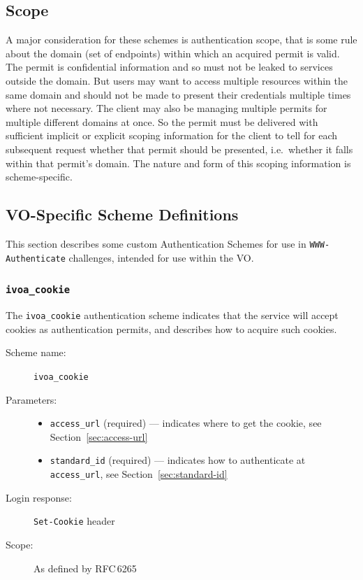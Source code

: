 \documentclass[11pt,a4paper]{ivoa}
\newcommand{\rfc}[1]{RFC\,#1}
\newcommand{\header}[1]{{\tt #1}}
\begin{document}
\subsection{Scope}\label{sec:scope}

A major consideration for these schemes is authentication scope,
that is some rule about the domain (set of endpoints) within which an
acquired permit is valid.
The permit is confidential information and so must not be leaked to services
outside the domain.
But users may want to access multiple resources within the same domain
and should not be made to present their credentials
multiple times where not necessary.
The client may also be managing multiple permits
for multiple different domains at once.
So the permit must be delivered with sufficient
implicit or explicit scoping
information for the client to tell for each subsequent request
whether that permit should be presented,
i.e.\ whether it falls within that permit's domain.
The nature and form of this scoping information is scheme-specific.



\subsection{VO-Specific Scheme Definitions}\label{sec:voschemes}

This section describes some custom Authentication Schemes
for use in \header{WWW-Authenticate} challenges,
intended for use within the VO.

\subsubsection{\mbox{\tt ivoa\_cookie}}\label{sec:ivoa-cookie}

The \verb|ivoa_cookie| authentication scheme indicates that the service
will accept cookies as authentication permits,
and describes how to acquire such cookies.

\begin{description}
  \item[Scheme name:] \verb|ivoa_cookie|
  \item[Parameters:] \mbox{}
  \begin{itemize}
    \item \verb|access_url| (required) ---
          indicates where to get the cookie,
          see Section~\ref{sec:access-url}
    \item \verb|standard_id| (required) ---
          indicates how to authenticate at \verb|access_url|,
          see Section~\ref{sec:standard-id}
  \end{itemize}
  \item[Login response:] \header{Set-Cookie} header
  \item[Scope:] As defined by \rfc{6265}
\end{description}
\end{document}
